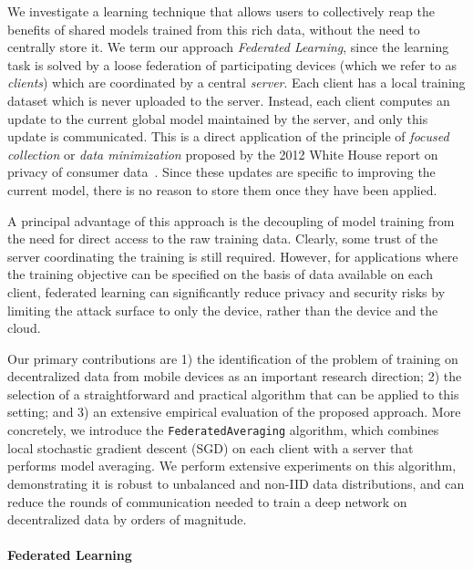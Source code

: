 \documentclass[twoside]{article}
\newcommand{\noaistats}[1]{}  %
\newcommand{\algfont}[1]{\texttt{#1}}
\newcommand{\fedavglong}{\algfont{FederatedAveraging}\xspace}
\begin{document}
We investigate a learning technique that allows users to collectively
reap the benefits of shared models trained from this rich data,
without the need to centrally store it.  \noaistats{This approach also allows us
to scale up learning by utilizing the plentiful computation available at
the edges of the network, conveniently colocated with the data.}
We term our approach \emph{Federated Learning}, since the learning
task is solved by a loose federation of participating devices (which
we refer to as \emph{clients}) which are coordinated by a central
\emph{server}. Each client has a local training dataset which is never
uploaded to the server. Instead, each client computes an update to the
current global model maintained by the server, and only this update is
communicated.  This is a direct application of the principle of
\emph{focused collection} or \emph{data minimization} proposed by the
2012 White House report on privacy of consumer
data~\citep{whitehouse13privacy}.  Since these updates are specific to
improving the current model, there is no reason to store them once
they have been applied.

A principal advantage of this approach is the decoupling of model training from the need for direct access to the raw training data. Clearly, some trust of the server coordinating the training is still required. However, for applications where the training objective can be specified on the basis of data available on each client, federated learning can significantly reduce privacy and security risks by limiting the attack surface to only the device, rather than the device and the cloud.

Our primary contributions are 1) the identification of the problem of
training on decentralized data from mobile devices as an important
research direction; 2) the selection of a straightforward and
practical algorithm that can be applied to this setting; and 3) an
extensive empirical evaluation of the proposed approach. More
concretely, we introduce the \fedavglong algorithm, which combines
local stochastic gradient descent (SGD) on each client with a server
that performs model averaging. We perform extensive experiments on
this algorithm, demonstrating it is robust to unbalanced and non-IID
data distributions, and can reduce the rounds of communication needed
to train a deep network on decentralized data by orders of magnitude.

\paragraph{Federated Learning}
\end{document}
